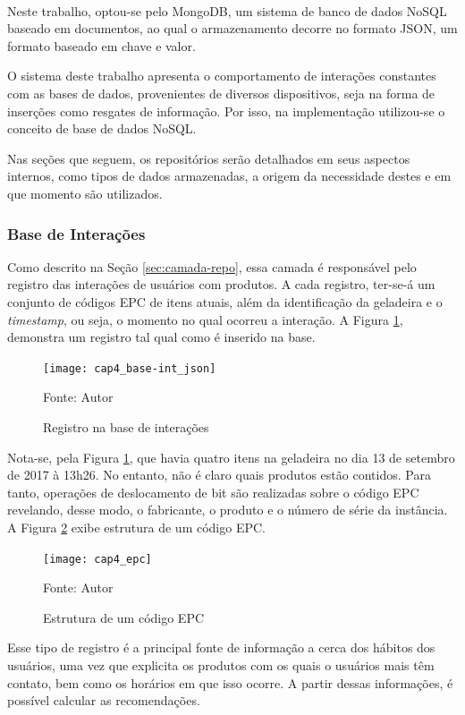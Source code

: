 Neste trabalho, optou-se pelo MongoDB\textsuperscript{\textregistered}, um sistema de banco de dados NoSQL baseado em documentos, ao qual o armazenamento decorre no formato JSON, um formato baseado em chave e valor. 

O sistema deste trabalho apresenta o comportamento de interações constantes com as bases de dados, provenientes de diversos dispositivos, seja na forma de inserções como resgates de informação. Por isso, na implementação utilizou-se o conceito de base de dados NoSQL.

Nas seções que seguem, os repositórios serão detalhados em seus aspectos internos, como tipos de dados armazenadas, a origem da necessidade destes e em que momento são utilizados.

\subsubsection{Base de Interações}

Como descrito na Seção \ref{sec:camada-repo}, essa camada é responsável pelo registro das interações de usuários com produtos. A cada registro, ter-se-á um conjunto de códigos EPC de itens atuais, além da identificação da geladeira e o \textit{timestamp}, ou seja, o momento no qual ocorreu a interação. A Figura \ref{fig:cap4_base-int_json}, demonstra um registro tal qual como é inserido na base.

\begin{figure}[htb]
    \caption{Registro na base de interações}
    \label{fig:cap4_base-int_json}
    \texttt{[image: cap4\_base-int\_json]}
    
    Fonte: Autor
\end{figure}

Nota-se, pela Figura \ref{fig:cap4_base-int_json}, que havia quatro itens na geladeira no dia 13 de setembro de 2017 à 13h26. No entanto, não é claro quais produtos estão contidos. Para tanto, operações de deslocamento de bit são realizadas sobre o código EPC revelando, desse modo, o fabricante, o produto e o número de série da instância. A Figura \ref{fig:cap4_epc} exibe estrutura de um código EPC.

\begin{figure}[htb]
    \caption{Estrutura de um código EPC}
    \label{fig:cap4_epc}
    \texttt{[image: cap4\_epc]}
    
    Fonte: Autor
\end{figure}

Esse tipo de registro é a principal fonte de informação a cerca dos hábitos dos usuários, uma vez que explicita os produtos com os quais o usuários mais têm contato, bem como os horários em que isso ocorre. A partir dessas informações, é possível calcular as recomendações.


